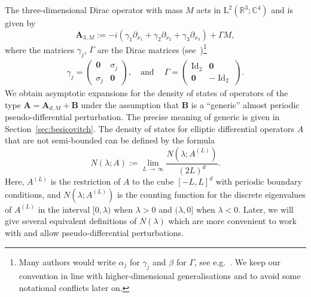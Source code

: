 \documentclass[10pt]{amsart}
\theoremstyle{definition}\newtheorem{defi}[theo]{Definition}\newtheorem{rema}[theo]{Remark}\newtheorem{exam}[theo]{Example}\newtheorem{nota}[theo]{Notation}
\DeclareMathOperator{\Id}{Id}
\newcommand{\RL}{\mathrm{L}}
\newcommand{\R}{\mathbb R}
\newcommand{\C}{\mathbb C}
\newcommand{\BA}{\mathbf A}
\newcommand{\BB}{\mathbf B}
\newcommand{\del}{\partial}
\begin{document}
The three-dimensional Dirac operator with mass $M$ acts in $\RL^2(\R^3;\C^4)$ and is given by
\begin{equation}
\BA_{3,M} := -i \left(\gamma_1 \del_{x_1} + \gamma_2 \del_{x_2} + \gamma_3
\del_{x_3} \right) + \Gamma M,
\end{equation}
where the matrices $\gamma_j$, $\Gamma$ are the Dirac matrices (see~\cite{Upmeier})\footnote{Many authors would write $\alpha_j$ for $\gamma_j$ and $\beta$ for $\Gamma$, see e.g.~\cite{thaller}. We keep our convention in line with higher-dimensional generalisations and to avoid some notational conflicts later on.}
\begin{equation}
\begin{aligned}
\gamma_j=
\begin{pmatrix}
\mathbf 0 & \sigma_j\\
\sigma_j & \mathbf 0
\end{pmatrix}, \quad \text{and} \quad\
\Gamma=
\begin{pmatrix}
\Id_2 & \mathbf 0\\
\mathbf 0 & -\Id_2
\end{pmatrix}.
\end{aligned}
\end{equation}
We obtain asymptotic expansions for the density of states of operators of the type $\BA = \BA_{d,M} + \BB$ under the assumption that $\BB$ is a ``generic'' almost periodic pseudo-differential perturbation. The precise meaning of generic is given in Section~\ref{sec:besicovitch}. The density of states for elliptic differential operators $A$ that are not semi-bounded can be defined by the formula
\begin{equation}
N(\lambda;A) := \lim_{L\,\to\,\infty} \frac{N(\lambda;A^{(L)})}{(2L)^d}.
\end{equation}
Here, $A^{(L)}$ is the restriction of $A$ to the cube $[-L,L]^d$ with periodic boundary conditions, and $N(\lambda;A^{(L)})$ is the counting function for the discrete eigenvalues of $A^{(L)}$ in the interval $[0,\lambda)$ when $\lambda > 0$ and $(\lambda,0]$ when $\lambda < 0$. Later, we will give several equivalent definitions of $N(\lambda)$ which are more convenient to work with and allow pseudo-differential perturbations.
\end{document}
